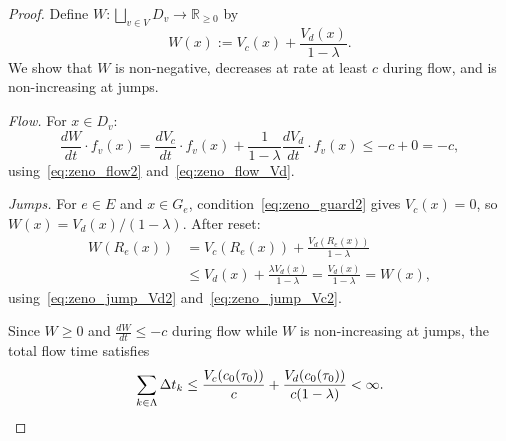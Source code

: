 \documentclass[10pt,a4paper]{amsart}
\newcommand{\R}{\mathbb R}
\newcommand{\maps}{\colon}
\begin{document}
\begin{proof}
    Define $W \maps \bigsqcup_{v \in V} D_v \to \R_{\geq 0}$ by
    \[
        W(x) := V_c(x) + \frac{V_d(x)}{1 - \lambda}.
    \]
    We show that $W$ is non-negative, decreases at rate at least $c$ during flow, and is non-increasing at jumps.

    \textit{Flow.} For $x \in D_v$:
    \[
        \frac{dW}{dt} \cdot f_v(x) = \frac{dV_c}{dt} \cdot f_v(x) + \frac{1}{1-\lambda}\frac{dV_d}{dt} \cdot f_v(x) \leq -c + 0 = -c,
    \]
    using~\eqref{eq:zeno_flow2} and~\eqref{eq:zeno_flow_Vd}.

    \textit{Jumps.} For $e \in E$ and $x \in G_e$, condition~\eqref{eq:zeno_guard2} gives $V_c(x) = 0$, so $W(x) = V_d(x)/(1 - \lambda)$. After reset:
    \begin{align*}
        W(R_e(x)) 
        &= V_c(R_e(x)) + \frac{V_d(R_e(x))}{1-\lambda} 
        \\&\leq V_d(x) + \frac{\lambda V_d(x)}{1-\lambda} = \frac{V_d(x)}{1-\lambda} = W(x),
    \end{align*}
    using~\eqref{eq:zeno_jump_Vd2} and~\eqref{eq:zeno_jump_Vc2}.

    Since $W \geq 0$ and $\frac{dW}{dt} \leq -c$ during flow while $W$ is non-increasing at jumps, the total flow time satisfies
    \[
        \sum_{k \in \Lambda} \Delta t_k 
        \leq 
        \frac{V_c(c_0(\tau_0))}{c} + \frac{V_d(c_0(\tau_0))}{c(1 - \lambda)} < \infty. \qedhere
    \]
\end{proof}
\end{document}

